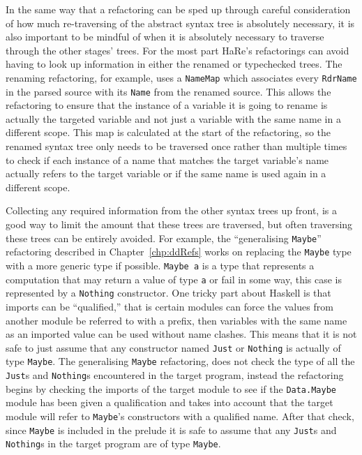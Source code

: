 In the same way that a refactoring can be sped up through careful consideration of how much re-traversing of the abstract syntax tree is absolutely necessary, it is also important to be mindful of when it is absolutely necessary to traverse through the other stages' trees. For the most part HaRe's refactorings can avoid having to look up information in either the renamed or typechecked trees. The renaming refactoring, for example, uses a \texttt{NameMap} which associates every \texttt{RdrName} in the parsed source with its \texttt{Name} from the renamed source. This allows the refactoring to ensure that the instance of a variable it is going to rename is actually the targeted variable and not just a variable with the same name in a different scope. This map is calculated at the start of the refactoring, so the renamed syntax tree only needs to be traversed once rather than multiple times to check if each instance of a name that matches the target variable's name actually refers to the target variable or if the same name is used again in a different scope.

Collecting any required information from the other syntax trees up front, is a good way to limit the amount that these trees are traversed, but often traversing these trees can be entirely avoided. For example, the ``generalising \texttt{Maybe}'' refactoring described in Chapter~\ref{chp:ddRefs} works on replacing the \texttt{Maybe} type with a more generic type if possible. \texttt{Maybe a} is a type that represents a computation that may return a value of type \texttt{a} or fail in some way, this case is represented by a \texttt{Nothing} constructor. One tricky part about Haskell is that imports can be ``qualified,'' that is certain modules can force the values from another module be referred to with a prefix, then variables with the same name as an imported value can be used without name clashes. This means that it is not safe to just assume that any constructor named \texttt{Just} or \texttt{Nothing} is actually of type \texttt{Maybe}.    The generalising \texttt{Maybe} refactoring, does not check the type of all the \texttt{Just}s and \texttt{Nothing}s encountered in the target program, instead the refactoring begins by checking the imports of the target module to see if the \texttt{Data.Maybe} module has been given a qualification and takes into account that the target module will refer to \texttt{Maybe}'s constructors with a qualified name. After that check, since \texttt{Maybe} is included in the prelude it is safe to assume that any \texttt{Just}s and \texttt{Nothing}s in the target program are of type \texttt{Maybe}.

